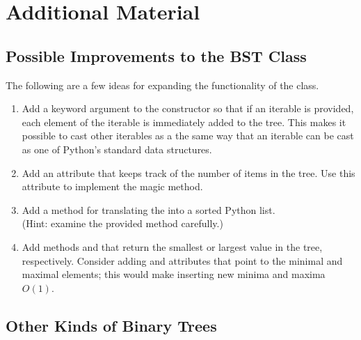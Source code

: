 
\newpage

\section*{Additional Material} %

\subsection*{Possible Improvements to the BST Class} %

The following are a few ideas for expanding the functionality of the  class.

\begin{enumerate}
\item Add a keyword argument to the constructor so that if an iterable is provided, each element of the iterable is immediately added to the tree.
This makes it possible to cast other iterables as a  the same way that an iterable can be cast as one of Python's standard data structures.
\item Add an attribute that keeps track of the number of items in the tree.
Use this attribute to implement the  magic method.
\item Add a method for translating the  into a sorted Python list.
\\(Hint: examine the provided  method carefully.)
\item Add methods  and  that return the smallest or largest value in the tree, respectively.
Consider adding  and  attributes that point to the minimal and maximal elements; this would make inserting new minima and maxima $O(1)$.
\end{enumerate}

\subsection*{Other Kinds of Binary Trees} %

